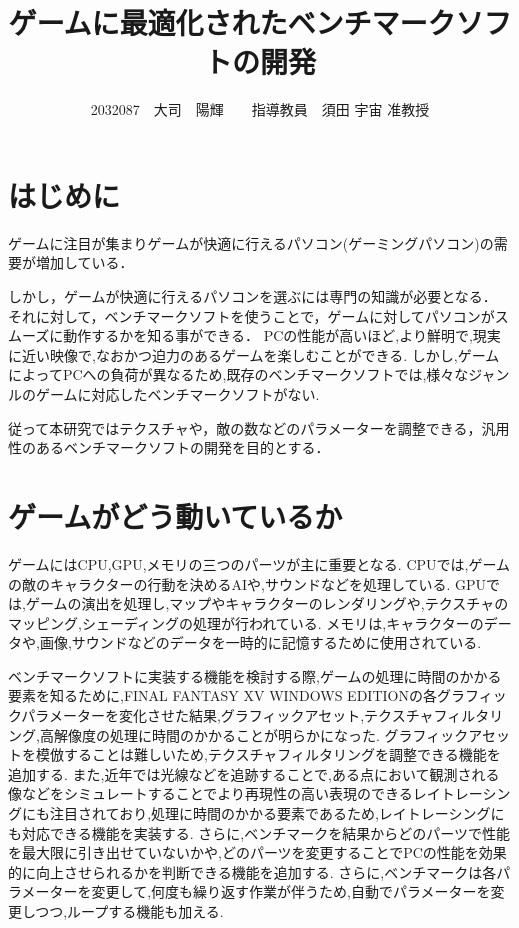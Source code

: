\documentclass[twocolumn,10pt,a4j]{ltjsarticle}
\title{ゲームに最適化されたベンチマークソフトの開発}
\author{2032087　大司　陽輝　　指導教員　須田 宇宙 准教授}
\date{}
\begin{document}
\maketitle

\section{はじめに}
ゲームに注目が集まりゲームが快適に行えるパソコン(ゲーミングパソコン)の需要が増加している．


しかし，ゲームが快適に行えるパソコンを選ぶには専門の知識が必要となる．
それに対して，ベンチマークソフトを使うことで，ゲームに対してパソコンがスムーズに動作するかを知る事ができる．
PCの性能が高いほど,より鮮明で,現実に近い映像で,なおかつ迫力のあるゲームを楽しむことができる.
しかし,ゲームによってPCへの負荷が異なるため,既存のベンチマークソフトでは,様々なジャンルのゲームに対応したベンチマークソフトがない.

従って本研究ではテクスチャや，敵の数などのパラメーターを調整できる，汎用性のあるベンチマークソフトの開発を目的とする．

\section{ゲームがどう動いているか}
ゲームにはCPU,GPU,メモリの三つのパーツが主に重要となる.
CPUでは,ゲームの敵のキャラクターの行動を決めるAIや,サウンドなどを処理している.
GPUでは,ゲームの演出を処理し,マップやキャラクターのレンダリングや,テクスチャのマッピング,シェーディングの処理が行われている.
メモリは,キャラクターのデータや,画像,サウンドなどのデータを一時的に記憶するために使用されている.

ベンチマークソフトに実装する機能を検討する際,ゲームの処理に時間のかかる要素を知るために,FINAL FANTASY XV WINDOWS EDITIONの各グラフィックパラメーターを変化させた結果,グラフィックアセット,テクスチャフィルタリング,高解像度の処理に時間のかかることが明らかになった.
グラフィックアセットを模倣することは難しいため,テクスチャフィルタリングを調整できる機能を追加する.
また,近年では光線などを追跡することで,ある点において観測される像などをシミュレートすることでより再現性の高い表現のできるレイトレーシングにも注目されており,処理に時間のかかる要素であるため,レイトレーシングにも対応できる機能を実装する.
さらに,ベンチマークを結果からどのパーツで性能を最大限に引き出せていないかや,どのパーツを変更することでPCの性能を効果的に向上させられるかを判断できる機能を追加する.
さらに,ベンチマークは各パラメーターを変更して,何度も繰り返す作業が伴うため,自動でパラメーターを変更しつつ,ループする機能も加える.
\end{document}
